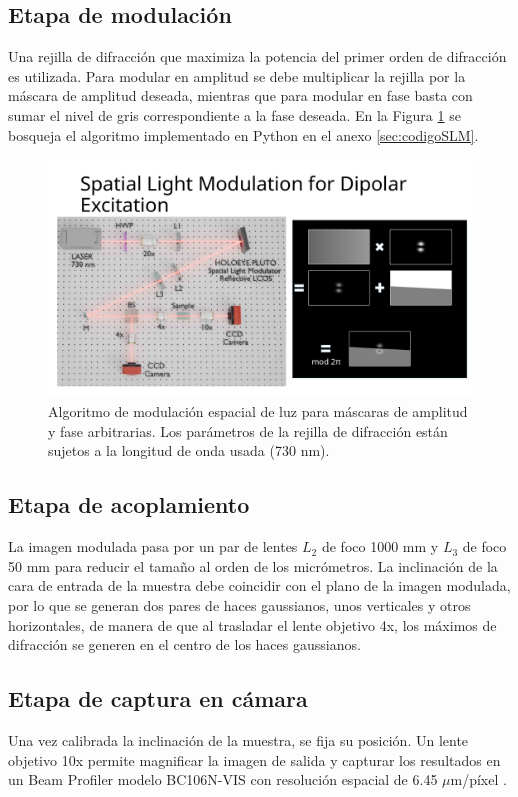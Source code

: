 \subsection{Etapa de modulación}
Una rejilla de difracción que maximiza la potencia del primer orden de difracción es utilizada. Para modular en amplitud se debe multiplicar la rejilla por la máscara de amplitud deseada, mientras que para modular en fase basta con sumar el nivel de gris correspondiente a la fase deseada. En la Figura \ref{fig:SLMblaze} se bosqueja el algoritmo implementado en Python en el anexo \ref{sec:codigoSLM}.

{
\begin{figure}
    \centering
    \includegraphics[width=0.35\linewidth, trim={19.5cm 0 0 5cm}, clip]{media/SLMblaze4.png}
    \caption[Modulación espacial de luz para máscaras de amplitud y fase arbitrarias.]{Algoritmo de modulación espacial de luz para máscaras de amplitud y fase arbitrarias. Los parámetros de la rejilla de difracción están sujetos a la longitud de onda usada (730 nm).\label{fig:SLMblaze}}
\end{figure}
}

\subsection{Etapa de acoplamiento}
La imagen modulada pasa por un par de lentes $L_2$ de foco 1000 mm y $L_3$ de foco 50 mm para reducir el tamaño al orden de los micrómetros. La inclinación de la cara de entrada de la muestra debe coincidir con el plano de la imagen modulada, por lo que se generan dos pares de haces gaussianos, unos verticales y otros horizontales, de manera de que al trasladar el lente objetivo 4x, los máximos de difracción se generen en el centro de los haces gaussianos.

\subsection{Etapa de captura en cámara}
Una vez calibrada la inclinación de la muestra, se fija su posición. Un lente objetivo 10x permite magnificar la imagen de salida y capturar los resultados en un Beam Profiler modelo BC106N-VIS con resolución espacial de 6.45 $\mu$m/píxel \citep{thorlabs_beam_profiler}.

